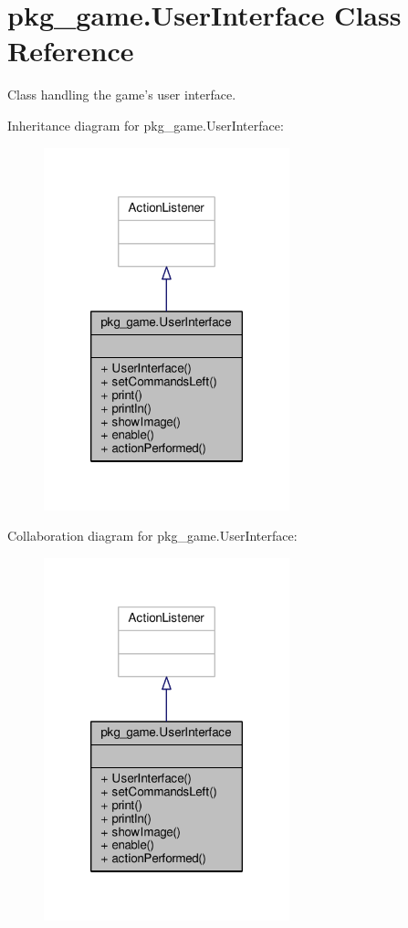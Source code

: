 \hypertarget{classpkg__game_1_1UserInterface}{\section{pkg\-\_\-game.\-User\-Interface Class Reference}
\label{classpkg__game_1_1UserInterface}
}


Class handling the game's user interface.  




Inheritance diagram for pkg\-\_\-game.\-User\-Interface\-:
\nopagebreak
\begin{figure}[H]
\begin{center}
\leavevmode
\includegraphics[width=202pt]{classpkg__game_1_1UserInterface__inherit__graph}
\end{center}
\end{figure}


Collaboration diagram for pkg\-\_\-game.\-User\-Interface\-:
\nopagebreak
\begin{figure}[H]
\begin{center}
\leavevmode
\includegraphics[width=202pt]{classpkg__game_1_1UserInterface__coll__graph}
\end{center}
\end{figure}
